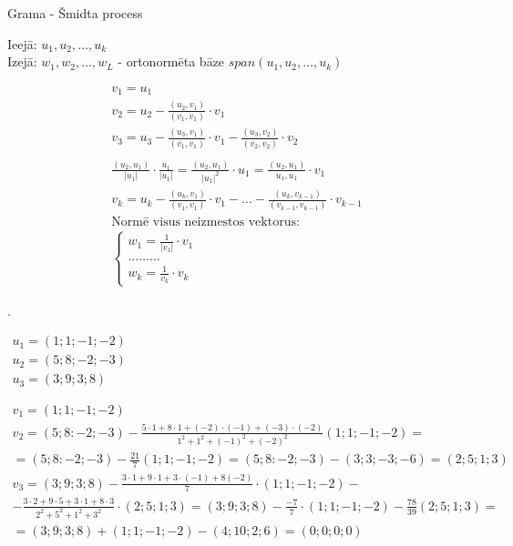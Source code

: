 \documentclass[12pt]{article}
\begin{document}

\pagebreak
Grama - Šmidta process %

Ieejā: $u_1, u_2, \ldots, u_k$ \\ 
Izejā: $w_1, w_2, \ldots, w_L$ - ortonormēta bāze $span(u_1, u_2, \ldots, u_k) $

\begin{gather*}
	v_1 = u_1 \\
	v_2 = u_2 - \frac{(u_2, v_1)}{(v_1, v_1)} \cdot v_1 \\
	v_3 = u_3 - \frac{(u_3, v_1)}{(v_1,v_1)} \cdot v_1 - \frac{(u_3, v_2)}{(v_2, v_2)} \cdot v_2 \\
	\\
	\frac{(u_2, u_1)}{|u_1|} \cdot \frac{u_1}{|u_1|} = \frac{(u_2, u_1)}{|u_1|^2} \cdot u_1 = \frac{(u_2, u_1)}{u_1, u_1} \cdot v_1 \\
	v_k = u_k - \frac{(u_k, v_1)}{(v_1, v_1)} \cdot v_1 - \ldots - \frac{(u_k, v_{k-1})}{(v_{k-1}, v_{k-1})} \cdot v_{k-1} \\
	\text{Normē visus neizmestos vektorus: } \\
	\begin{cases*}
		w_1 = \frac{1}{|v_1|} \cdot v_1 \\
		\ldots \ldots \ldots \\
		w_k  =\frac{1}{v_k} \cdot v_k
	\end{cases*}
\end{gather*}


. 

\begin{gather*}
	u_1 = (1; 1; -1; -2) \\
	u_2 = (5; 8; -2; -3) \\
	u_3 = (3; 9; 3; 8) \\ \\ \\ 
	v_1 = (1;1;-1;-2) \\
	v_2 = (5; 8: -2; -3) - \frac {5 \cdot 1 + 8 \cdot 1 + (-2) \cdot (-1) + (-3) \cdot (-2) } {1^2 + 1^2 + (-1)^2 + (-2)^2} (1;1;-1;-2) = \\
	=  (5; 8: -2; -3) - \frac{21}{7} (1; 1; -1; -2) =  (5; 8: -2; -3) - (3; 3; -3; -6) = (2;5;1;3) \\
	v_3 = (3; 9; 3; 8) - \frac{3 \cdot 1 + 9 \cdot 1 + 3 \cdot (-1) + 8 (-2)}{7} \cdot (1; 1; -1; -2) - \\
	-  \frac {3 \cdot 2 + 9 \cdot 5 + 3 \cdot 1 + 8 \cdot 3}{2^2 + 5^2 + 1^2 + 3^2} \cdot (2;5;1;3) = (3;9;3;8) - \frac{-7}{7} \cdot (1;1;-1;-2) - \frac{78}{39} (2;5;1;3) =  \\
	= (3;9;3;8) + (1;1;-1;-2) - (4;10;2;6) = (0;0;0;0)
\end{gather*}
\end{document}
